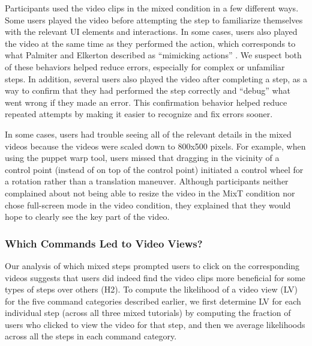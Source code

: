 Participants used the video clips in the mixed condition in a few different ways. Some users played the video before attempting the step to familiarize themselves with the relevant UI elements and interactions. In some cases, users also played the video at the same time as they performed the action, which corresponds to what Palmiter and Elkerton described as ``mimicking actions'' \cite{Palmiter:1991:ADV:107792.107797}. We suspect both of these behaviors helped reduce errors, especially for complex or unfamiliar steps. In addition, several users also played the video after completing a step, as a way to confirm that they had performed the step correctly and “debug” what went wrong if they made an error. This confirmation behavior helped reduce repeated attempts by making it easier to recognize and fix errors sooner.

In some cases, users had trouble seeing all of the relevant details in the mixed videos because the videos were scaled down to 800x500 pixels. For example, when using the puppet warp tool, users missed that dragging in the vicinity of a control point (instead of on top of the control point) initiated a control wheel for a rotation rather than a translation maneuver. Although participants neither complained about not being able to resize the video in the MixT condition nor chose full-screen mode in the video condition, they explained that they would hope to clearly see the key part of the video.

\subsubsection{Which Commands Led to Video Views?}
Our analysis of which mixed steps prompted users to click on the corresponding videos suggests that users did indeed find the video clips more beneficial for some types of steps over others (H2). To compute the likelihood of a video view (LV) for the five command categories described earlier, we first determine LV for each individual step (across all three mixed tutorials) by computing the fraction of users who clicked to view the video for that step, and then we average likelihoods across all the steps in each command category.

